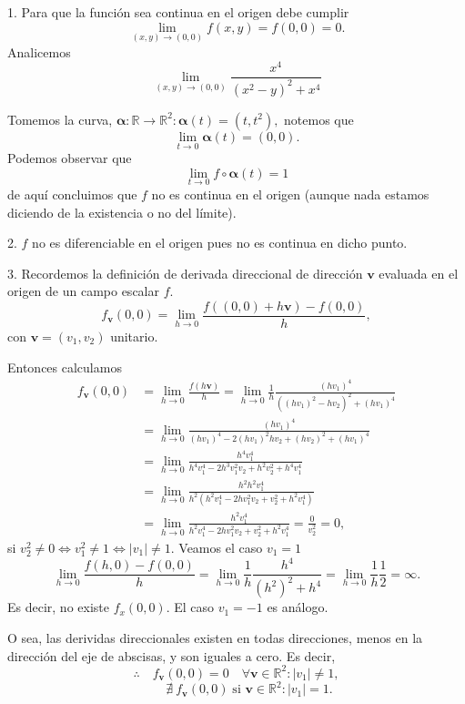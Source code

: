 \begin{solution}
    1. Para que la función sea continua en el origen  debe cumplir
    \[
    \lim_{(x,y)\to(0,0)} f(x,y) = f(0,0) =0.
    \]
Analicemos
    \[
    \lim_{(x,y)\to(0,0)} \frac{x^4}{(x^2-y)^2+x^4}
    \]
    
  Tomemos  la curva,  $\boldsymbol{\alpha}:\mathbb{R}\to\mathbb{R}^2:  \boldsymbol{\alpha}(t)=(t,t^2),$ notemos que  $$\lim_{t\to0}\boldsymbol{\alpha}(t)=(0,0).$$   Podemos observar que $$ \lim_{t\to0} f\circ\boldsymbol{\alpha}(t) = 1$$  de aqu\'i concluimos que $f$ no es continua en el origen (aunque nada estamos diciendo de la existencia o no del l\'imite).

    2. $f$ no es diferenciable en el origen pues no es continua en dicho punto.

    3. Recordemos la definici\'on de derivada direccional de direcci\'on ${\mathbf{v}}$ evaluada en el origen de un campo escalar $f$. 
    \[
        f_{{\mathbf{v}}}(0,0)=\lim_{h\to0}\frac{f((0,0)+h{\mathbf{v}})-f(0,0)}{h},
    \]
    con  ${\mathbf{v}}=(v_1,v_2)$ unitario.

    Entonces calculamos
    \begin{align*}
        f_{{\mathbf{v}}}(0,0)&=\lim_{h\to0}\frac{f(h{\mathbf{v}})}{h}=\lim_{h\to0}\frac{1}{h}\frac{(hv_1)^4}{((hv_1)^2-hv_2)^2+(hv_1)^4}\\[.2cm]
        &=\lim_{h\to0}\frac{(hv_1)^4}{(hv_1)^4-2(hv_1)^2hv_2+(hv_2)^2+(hv_1)^4}\\[.2cm]
        &=\lim_{h\to0}\frac{h^4v_1^4}{h^4v_1^4-2h^3v_1^2v_2+h^2v_2^2+h^4v_1^4}\\[.2cm]
        &=\lim_{h\to0}\frac{h^2h^2v_1^4}{h^2(h^2v_1^4-2hv_1^2v_2+v_2^2+h^2v_1^4)}\\[.2cm]
        &=\lim_{h\to0}\frac{h^2v_1^4}{h^2v_1^4-2hv_1^2v_2+v_2^2+h^2v_1^4}=\frac{0}{v_2^2}=0,
    \end{align*}
    si $v_2^2 \neq 0 \iff v_1^2 \neq 1 \iff |v_1| \neq 1$.  Veamos el caso  $v_1 = 1$  
 $$  \lim_{h\to0} \frac{f(h,0)-f(0,0)}{h} = \lim_{h\to0} \frac{1}{h}\frac{h^4}{(h^2)^2+h^4}=\lim_{h\to0}\frac{1}{h}\frac{1}{2}=\infty.$$ Es decir, no existe $f_x(0,0)$.  El caso  $v_1 = -1$ es an\'alogo. 
 
    
O sea, las derividas direccionales existen en todas direcciones, menos en la dirección del eje de abscisas, y son iguales a cero. Es decir,
    \[  \therefore\quad f_{{\mathbf{v}}}(0,0)=0\quad\forall{\mathbf{v}}\in\mathbb{R}^2: |v_1| \neq1,  \]
    \[ \quad  \quad   \nexists \:f_{{\mathbf{v}}}(0,0) \;\mbox{si }{\mathbf{v}}\in\mathbb{R}^2: |v_1| = 1. \]
        
   

\end{solution}

